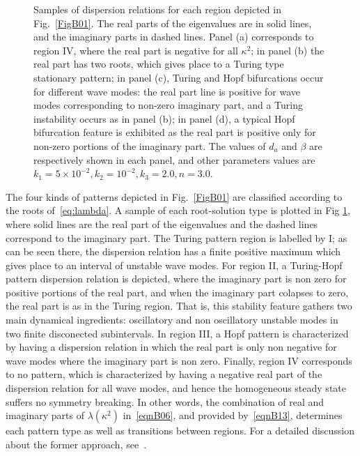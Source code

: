 \documentclass[%
 preprint,
 amsmath,amssymb,
 aps,
]{revtex4-2}
\begin{document}
\begin{figure}[t!]
	\caption{Samples of dispersion relations for each region depicted in Fig.~\ref{FigB01}. The real parts of the eigenvalues are in solid lines, and the imaginary parts in dashed lines.  Panel (a) corresponds to region IV, where the real part is negative for all $\kappa^2$; in panel (b) the real part has two roots, which gives place to a Turing type stationary pattern; in panel (c), Turing and Hopf bifurcations occur for different wave modes: the real part line is positive for wave modes corresponding to non-zero imaginary part, and a Turing instability occurs as in panel (b); in  panel (d), a typical Hopf bifurcation feature is exhibited as the real part is positive only for non-zero portions of the imaginary part. The values of $d_a$ and $\beta$ are respectively shown in each panel, and other parameters values are $k_1=5\times10^{-2}, k_2=10^{-2}, k_3=2.0, n=3.0$.}
	\label{FigB02}
\end{figure}

The four kinds of patterns depicted in Fig.~\ref{FigB01} are classified according to the roots of~\eqref{eq:lambda}. A sample of each root-solution type is plotted in Fig \ref{FigB02}, where solid lines are  the real part of the eigenvalues and the dashed lines correspond to the imaginary part. The Turing pattern region is labelled by I; as can be seen there, the dispersion relation has a finite positive maximum which gives place to an interval of unstable wave modes. For region II, a Turing-Hopf pattern dispersion relation is depicted, where the imaginary part is non zero for positive portions of the real part, and when the imaginary part colapses to zero, the real part is as in the Turing region. That is, this stability feature gathers two main dynamical ingredients: oscillatory and non oscillatory unstable modes in two finite disconected subintervals. In region III, a Hopf pattern is characterized by having a dispersion relation in which the real part is only non negative for wave modes where the imaginary part is non zero. Finally, region IV corresponds to no pattern, which is characterized by having a negative real part of the dispersion relation for all wave modes, and hence the homogeneous steady state suffers no symmetry breaking. In other words, the combination of real and imaginary parts of $\lambda(\kappa^2)$ in~\eqref{eqnB06}, and provided by~\eqref{eqnB13}, determines each pattern type as well as transitions between regions. For a detailed discussion about the former approach, see~\citep{liu}.
\end{document}
